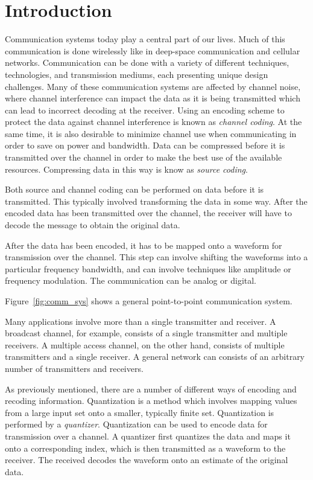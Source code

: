 \documentclass[10pt]{article}
\begin{document}
\section{Introduction}
Communication systems today play a central part of our lives. Much of this communication is done wirelessly like in deep-space communication and cellular networks. Communication can be done with a variety of different techniques, technologies, and transmission mediums, each presenting unique design challenges. Many of these communication systems are affected by channel noise, where channel interference can impact the data as it is being transmitted which can lead to incorrect decoding at the receiver. Using an encoding scheme to protect the data against channel interference is known as \emph{channel coding}. At the same time, it is also desirable to minimize channel use when communicating in order to save on power and bandwidth. Data can be compressed before it is transmitted over the channel in order to make the best use of the available resources. Compressing data in this way is know as \emph{source coding}.

Both source and channel coding can be performed on data before it is transmitted. This typically involved transforming the data in some way. After the encoded data has been transmitted over the channel, the receiver will have to decode the message to obtain the original data.

After the data has been encoded, it has to be mapped onto a waveform for transmission over the channel. This step can involve shifting the waveforms into a particular frequency bandwidth, and can involve techniques like amplitude or frequency modulation. The communication can be analog or digital.

Figure~\ref{fig:comm_sys} shows a general point-to-point communication system.

Many applications involve more than a single transmitter and receiver. A broadcast channel, for example, consists of a single transmitter and multiple receivers. A multiple access channel, on the other hand, consists of multiple transmitters and a single receiver. A general network can consists of an arbitrary number of transmitters and receivers.

As previously mentioned, there are a number of different ways of encoding and recoding information. Quantization is a method which involves mapping values from a large input set onto a smaller, typically finite set. Quantization is performed by a \emph{quantizer}. Quantization can be used to encode data for transmission over a channel. A quantizer first quantizes the data and maps it onto a corresponding index, which is then transmitted as a waveform to the receiver. The received decodes the waveform onto an estimate of the original data.
\end{document}
